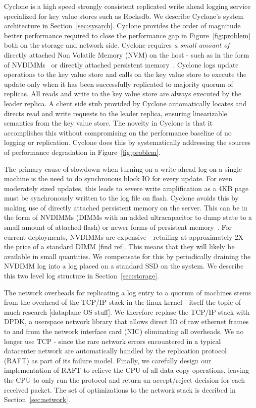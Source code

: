 \documentclass[pageno]{jpaper}
\begin{document}
Cyclone is a high speed strongly consistent replicated write ahead logging
service specialized for key value stores such as Rocksdb. We describe Cyclone's
system architecture in Section~\ref{sec:sysarch}. Cyclone provides the order of
magnitude better performance required to close the performance gap in
Figure~\ref{fig:problem} both on the storage and network side. Cyclone requires
\emph{a small amount of} directly attached Non Volatile Memory (NVM) on the host
- such as in the form of NVDIMMs~\cite{farm} or directly attached persistent
memory~\cite{pmfs}. Cyclone logs update operations to the key value store and
calls on the key value store to execute the update only when it has been
successfully replicated to majority quorum of replicas. All reads and write to
the key value store are always executed by the leader replica. A client side
stub provided by Cyclone automatically locates and directs read and write
requests to the leader replica, ensuring linearizable semantics from the key
value store. The novelty in Cyclone is that it accomplishes this without
compromising on the performance baseline of no logging or replication. Cyclone
does this by systematically addressing the sources of performance degradation in
Figure~\ref{fig:problem}.

The primary cause of slowdown when turning on a write ahead log on a single
machine is the need to do synchronous block IO for every update. For even
moderately sized updates, this leads to severe write amplification as a 4KB page
must be synchronously written to the log file on flash. Cyclone avoids this by
making use of directly attached persistent memory on the server. This can be in
the form of NVDIMMs (DIMMs with an added ultracapacitor to dump state to a small
amount of attached flash) or newer forms of persistent memory~\cite{pmfs}. For
current deployments, NVDIMMs are expensive - retailing at approximately 2X the
price of a standard DIMM [find ref]. This means that they will likely be
available in small quantities. We compensate for this by periodically draining
the NVDIMM log into a log placed on a standard SSD on the system. We describe
this two level log structure in Section~\ref{sec:storage}.

The network overheads for replicating a log entry to a quorum of machines stems
from the overhead of the TCP/IP stack in the linux kernel - itself the topic of
much research [dataplane OS stuff]. We therefore replase the TCP/IP stack with
DPDK, a userspace network library that allows direct IO of raw ethernet frames
to and from the network interface card (NIC) eliminating all overheads. We no
longer use TCP - since the rare network errors encountered in a typical
datacenter network are automatically handled by the replication protocol (RAFT)
as part of its failure model. Finally, we carefully design our implementation of
RAFT to relieve the CPU of all data copy operations, leaving the CPU to only
run the protocol and return an accept/reject decision for each received
packet. The set of optimizations to the network stack is decribed in
Section~\ref{sec:network}.
\end{document}

